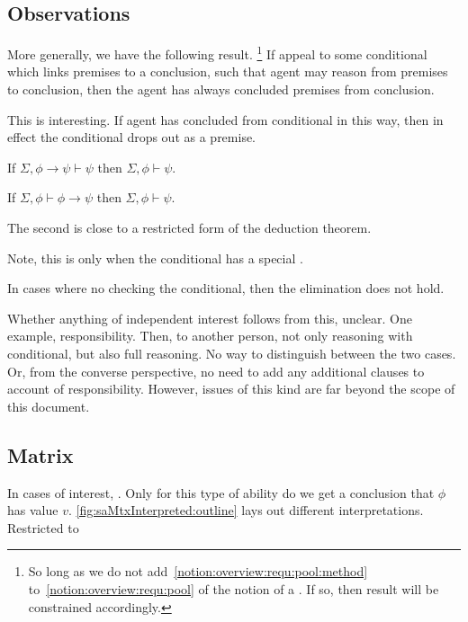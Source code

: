 \subsection{Observations}
\label{sec:observations}

\begin{note}
  More generally, we have the following result.\nolinebreak
  \footnote{
    So long as we do not add~\autoref{notion:overview:requ:pool:method} to~\autoref{notion:overview:requ:pool} of the notion of a \requ{}.
    If so, then result will be constrained accordingly.
  }
  If appeal to some conditional which links premises to a conclusion, such that agent may reason from premises to conclusion, then the agent has always concluded premises from conclusion.

  This is interesting.
  If agent has concluded from conditional in this way, then in effect the conditional drops out as a premise.

  If \(\Sigma, \phi \rightarrow \psi \vdash \psi\) then \(\Sigma, \phi \vdash \psi\).

  If \(\Sigma, \phi \vdash \phi \rightarrow \psi\) then \(\Sigma, \phi \vdash \psi\).

  The second is close to a restricted form of the deduction theorem.

  Note, this is only when the conditional has a special \requ{}.

  In cases where no checking the conditional, then the elimination does not hold.

  Whether anything of independent interest follows from this, unclear.
  One example, responsibility.
  Then, to another person, not only reasoning with conditional, but also full reasoning.
  No way to distinguish between the two cases.
  Or, from the converse perspective, no need to add any additional clauses to account of responsibility.
  However, issues of this kind are far beyond the scope of this document.
\end{note}

\subsection{Matrix}

\begin{note}
  In cases of interest, .
  Only for this type of ability do we get a conclusion that \(\phi\) has value \(v\).
  \autoref{fig:saMtxInterpreted:outline} lays out different interpretations.
  Restricted to \adB{}
\end{note}

